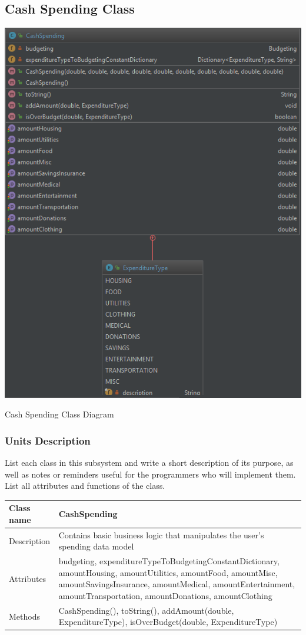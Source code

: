 \documentclass[12pt]{article}
\begin{document}
\subsection{Cash Spending Class}
\includegraphics{cashspending}

\caption{Cash Spending Class Diagram}

\subsubsection{Units Description}
List each class in this subsystem and write a short description of its purpose,
as well as notes or reminders useful for the programmers who will implement them.
List all attributes and functions of the class.

\begin{center}
\begin{tabular}{|p{2cm}||p{15cm}|}
\hline
Class name & CashSpending \\
\hline
Description & Contains basic business logic that manipulates the user's spending data model\\
\hline

Attributes & budgeting,
expenditureTypeToBudgetingConstantDictionary, 
amountHousing,
amountUtilities,
amountFood,
amountMisc,
amountSavingsInsurance,
amountMedical,
amountEntertainment,
amountTransportation,
amountDonations,
amountClothing\\
\hline
Methods & CashSpending(),
toString(),
addAmount(double, ExpenditureType),
isOverBudget(double, ExpenditureType)\\
\hline
\end{tabular}
\end{center}
\end{document}

